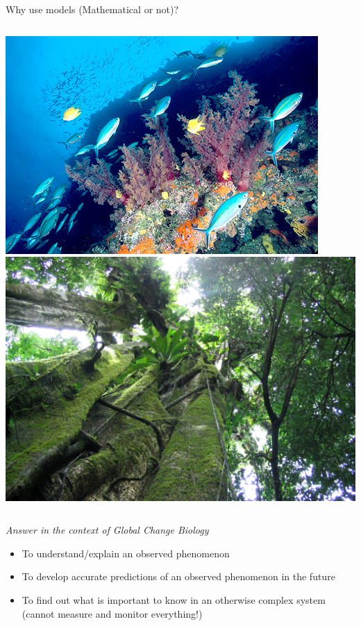 \documentclass[xcolor={usenames,x11names},compress]{beamer}
\renewcommand{\(}{\begin{columns}}
\renewcommand{\)}{\end{columns}}
\newcommand{\<}[1]{\begin{column}{#1}}
\renewcommand{\>}{\end{column}}
\begin{document}
\begin{frame}{Why use models (Mathematical or not)?}

  \begin{columns}[c]
    \column{2.3in}
    \includegraphics[width=\textwidth]{Reef.jpg}
    \column{2.3in}
    \includegraphics[width=\textwidth]{Forest.jpg}
  \end{columns}

  \centering
  {\it Answer in the context of Global Change Biology}

  \pause

  \begin{itemize}[<+->] \itemsep4pt
  
      \item To understand/explain an observed phenomenon     

      \item To develop accurate predictions of an observed phenomenon in the future    
      
      \item To find out what is important to know in an otherwise complex system
      (cannot measure and monitor everything!)
    
  \end{itemize}

\end{frame}
\end{document}
